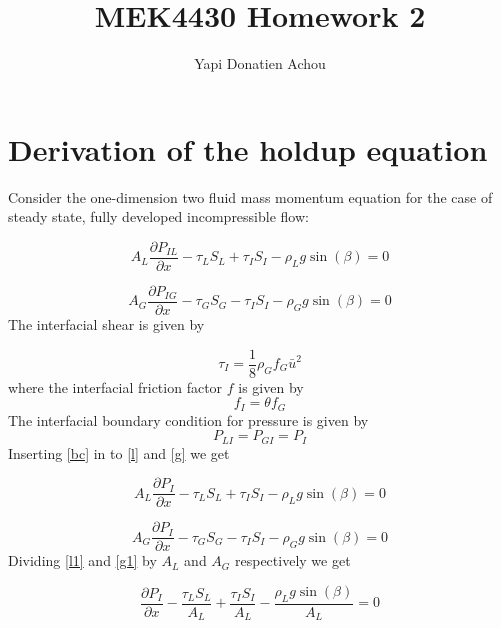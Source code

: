 \documentclass[10pt,a4paper]{report}
\begin{document}
\author{Yapi Donatien Achou}
\title{MEK4430 Homework 2}
\maketitle

\section{Derivation of the holdup equation}
Consider the one-dimension two fluid mass momentum equation for the case of steady state, fully developed incompressible flow:

\begin{equation} \label{l}
A_{L}\frac{\partial P_{IL}}{\partial x}-\tau_{L}S_{L}+\tau_{I}S_{I}-\rho_{L}g\sin (\beta)  = 0
\end{equation}

\begin{equation} \label{g}
A_{G}\frac{\partial P_{IG}}{\partial x}-\tau_{G}S_{G}-\tau_{I}S_{I}-\rho_{G}g\sin (\beta)  = 0
\end{equation}
The interfacial shear is given by

\begin{equation}
\tau_{I} = \frac{1}{8}\rho_{G}f_{G}\bar{u}^{2}
\end{equation}
where the interfacial friction factor $f$ is given by
\begin{equation}
f_{I} = \theta f_{G}
\end{equation}
The interfacial boundary condition for pressure is given by
\begin{equation}\label{bc}
P_{LI} = P_{GI} = P_{I}
\end{equation}
 Inserting \ref{bc} in to \ref{l} and \ref{g} we get 
 
 \begin{equation} \label{l1}
A_{L}\frac{\partial P_{I}}{\partial x}-\tau_{L}S_{L}+\tau_{I}S_{I}-\rho_{L}g\sin (\beta)  = 0
\end{equation}

\begin{equation} \label{g1}
A_{G}\frac{\partial P_{I}}{\partial x}-\tau_{G}S_{G}-\tau_{I}S_{I}-\rho_{G}g\sin (\beta)  = 0
\end{equation}
Dividing \ref{l1} and \ref{g1} by $A_{L}$ and $A_{G}$ respectively we get

\begin{equation} \label{l2}
\frac{\partial P_{I}}{\partial x}-\frac{\tau_{L}S_{L}}{A_{L}}+\frac{\tau_{I}S_{I}}{A_{L}}-\frac{\rho_{L}g\sin (\beta)}{A_{L}}  = 0
\end{equation}
\end{document}
